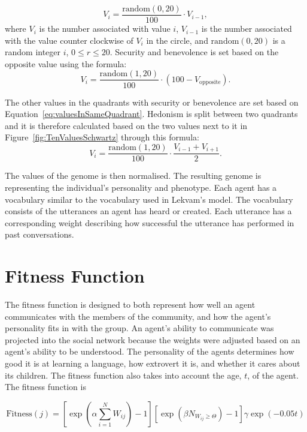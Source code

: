 \begin{equation}\label{eq:valuesInSameQuadrant}
V_{i} = \frac{\mathrm{random}(0, 20)}{100} \cdot V_{i-1},
\end{equation}
where $V_{i}$ is the number associated with value $i$, $V_{i-1}$ is the number associated with the value counter clockwise of $V_i$ in the circle, and $\mathrm{random}(0, 20)$ is a random integer $i$, $0 \leq r \leq 20$. Security and benevolence is set based on the opposite value using the formula:
\begin{equation}\label{eq:valuesInOppositeQuadrant}
V_{i} = \frac{\mathrm{random}(1, 20)}{100} \cdot (100 - V_{\mathrm{opposite}}).
\end{equation}

The other values in the quadrants with security or benevolence are set based on Equation~\eqref{eq:valuesInSameQuadrant}. Hedonism is split between two quadrants and it is therefore calculated based on the two values next to it in Figure~\ref{fig:TenValuesSchwartz} through this formula:
\begin{equation}\label{eq:hedonism}
V_{i} = \frac{\mathrm{random}(1, 20)}{100} \cdot \frac{V_{i-1} + V_{i+1}}{2}.
\end{equation}

The values of the genome is then normalised. The resulting genome is representing the individual’s personality and phenotype.  Each agent has a vocabulary similar to the vocabulary used in Lekvam’s model. The vocabulary consists of the utterances an agent has heard or created. Each utterance has a corresponding weight describing how successful the utterance has performed in past conversations.

\section{Fitness Function}

The fitness function is designed to both represent how well an agent communicates with the members of the community, and how the agent’s personality fits in with the group. An agent's ability to communicate was projected into the social network because the weights were adjusted based on an agent’s ability to be understood. The personality of the agents determines how good it is at learning a language, how extrovert it is, and whether it cares about its children. The fitness function also takes into account the age, $t$, of the agent. The fitness function is

\begin{equation}\label{eq:Fitness}
\text{Fitness}(j) = \left[ \exp\left(\alpha \sum_{i=1}^{N}{W_{ij}}\right)-1 \right] \left[ \exp\left(\beta N_{W_{ij} \geq \Theta}\right) -1 \right] \gamma \exp\left(-0.05 t\right)
\end{equation}

